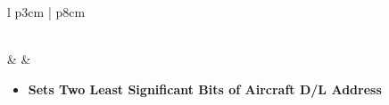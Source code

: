 \documentclass[8pt,usenames,dvipsnames,twoside]{article}
\begin{document}
\begin{center}
\begin{longtable}{l p{3cm} | p{8cm}}
\begin{minipage}[t]{\linewidth}
\begin{itemize}
\begin{itemize}
						\end{itemize}
					\end{itemize}
				\end{minipage} \\
				\midrule
				\textbullet &  & 
				\begin{minipage}[t]{\linewidth}
					\vspace{-7pt}
					\begin{itemize}
						\item \textbf{Sets Two Least Significant Bits of Aircraft D/L Address}
					\end{itemize}
				\end{minipage} \\
				\bottomrule
			\end{longtable}
		\end{center}
		
		\clearpage
		
\end{document}
